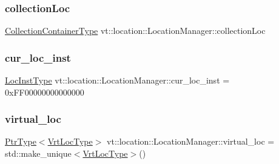 \subsubsection{\texorpdfstring{collection\+Loc}{collectionLoc}}
{\footnotesize\ttfamily \hyperlink{structvt_1_1location_1_1_location_manager_a03472723aecf57cd99cd221ef2164edb}{Collection\+Container\+Type} vt\+::location\+::\+Location\+Manager\+::collection\+Loc\hspace{0.3cm}{\ttfamily [protected]}}

\mbox{\label{structvt_1_1location_1_1_location_manager_a644b4b030fd616375728316281295250}} 
\subsubsection{\texorpdfstring{cur\+\_\+loc\+\_\+inst}{cur\_loc\_inst}}
{\footnotesize\ttfamily \hyperlink{namespacevt_1_1location_a4db6456e8024af2d23fc5ae560fef866}{Loc\+Inst\+Type} vt\+::location\+::\+Location\+Manager\+::cur\+\_\+loc\+\_\+inst = 0x\+F\+F00000000000000\hspace{0.3cm}{\ttfamily [static]}}

\mbox{\label{structvt_1_1location_1_1_location_manager_af8cbcba6c30a17a56d69fcf48007cdad}} 
\subsubsection{\texorpdfstring{virtual\+\_\+loc}{virtual\_loc}}
{\footnotesize\ttfamily \hyperlink{structvt_1_1location_1_1_location_manager_a32d8bca6ed6909a2190286408335d3b4}{Ptr\+Type}$<$\hyperlink{structvt_1_1location_1_1_location_manager_a06ec1698d93780afdf7873eeaa3a77b6}{Vrt\+Loc\+Type}$>$ vt\+::location\+::\+Location\+Manager\+::virtual\+\_\+loc = std\+::make\+\_\+unique$<$\hyperlink{structvt_1_1location_1_1_location_manager_a06ec1698d93780afdf7873eeaa3a77b6}{Vrt\+Loc\+Type}$>$()}

